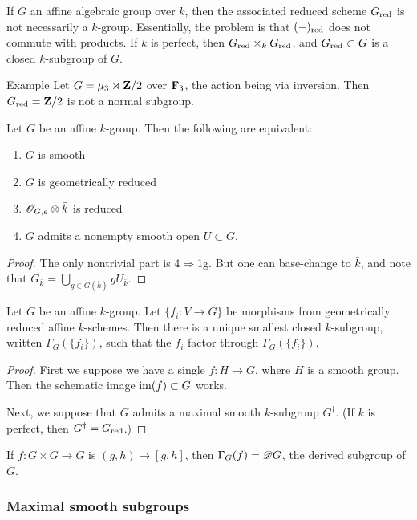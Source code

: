 If $G$ an affine algebraic group over $k$, then the associated reduced scheme 
$G_{\mathrm{red}}$ is not necessarily a $k$-group. Essentially, the problem is that 
$(-)_{\mathrm{red}}$ does not commute with products. If $k$ is perfect, then 
$G_{\mathrm{red}}\times_k G_{\mathrm{red}}$, and $G_{\mathrm{red}}\subset G$ is a closed 
$k$-subgroup of $G$. 

\begin{enonce}[remark]{Example}
Let $G=\mu_3\rtimes \mathbf{Z}/2$ over $\mathbf{F}_3$, the action being via inversion. Then 
$G_{\mathrm{red}}=\mathbf{Z}/2$ is not a normal subgroup. 
\end{enonce}

\begin{lemm}
Let $G$ be an affine $k$-group. Then the following are equivalent: 
\begin{enumerate}
  \item $G$ is smooth 
  \item $G$ is geometrically reduced 
  \item $\mathscr{O}_{G,e}\otimes \bar k$ is reduced 
  \item $G$ admits a nonempty smooth open $U\subset G$. 
\end{enumerate}
\end{lemm}
\begin{proof}
The only nontrivial part is 4$\Rightarrow$1g. But one can base-change to 
$\bar k$, and note that $G_{\bar k}=\bigcup_{g\in G(\bar k)} g U_{\bar k}$. 
\end{proof}

\begin{prop}
Let $G$ be an affine $k$-group. Let $\{f_i:V\to G\}$ be morphisms from 
geometrically reduced affine $k$-schemes. Then there is a unique smallest 
closed $k$-subgroup, written $\Gamma_G(\{f_i\})$, such that the $f_i$ 
factor through $\Gamma_G(\{f_i\})$. 
\end{prop}
\begin{proof}
First we suppose we have a single $f:H\to G$, where $H$ is a smooth group. 
Then the schematic image $\operatorname{im}(f)\subset G$ works. 

Next, we suppose that $G$ admits a maximal smooth $k$-subgroup $G^\dag$. (If 
$k$ is perfect, then $G^\dag=G_{\mathrm{red}}$.) 
\end{proof}

If $f:G\times G\to G$ is 
$(g,h)\mapsto [g,h]$, then $\Gamma_G(f) = \mathscr{D} G$, the derived subgroup of 
$G$. 


\subsubsection{Maximal smooth subgroups}


